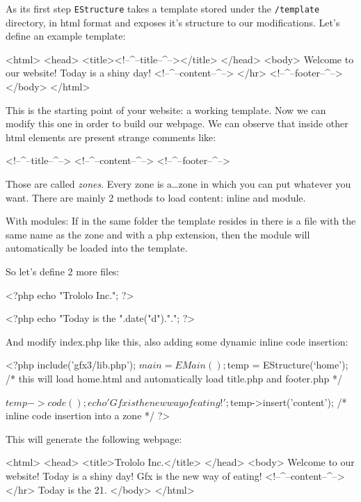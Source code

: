 \documentclass[a4paper,10pt]{article}
\newenvironment{file}[1]{
    \program
    \caption*{\textbf{File:} \texttt{#1}}
    \verbatim
}{
    \endverbatim
    \endprogram
}
\newenvironment{code}[1]{
    \program
    \caption*{#1}
    \verbatim
}{
    \endverbatim
    \endprogram
}
\begin{document}
As its first step \texttt{EStructure} takes a template stored under the \texttt{/template} directory,
in html format and exposes it's structure to our modifications. Let's define an example template:

\begin{file}{/template/home.html}
<html>
  <head>
    <title><!--^--title--^--></title>
  </head>
  <body>
    Welcome to our website! Today is a shiny day!
    <!--^--content--^-->
    </hr>
    <!--^--footer--^-->
  </body>
</html>
\end{file}

This is the starting point of your website: a working template. Now we can modify this one in order to build our webpage.
We can observe that inside other html elements are present strange comments like:
\begin{code}{Example zones}
<!--^--title--^-->
<!--^--content--^-->
<!--^--footer--^-->
\end{code}

Those are called \emph{zones}.
Every zone is a\ldots zone in which you can put whatever you want.
There are mainly 2 methods to load content: inline and module.

With modules:
If in the same folder the template resides in there is a file with the same name as the zone
and with a php extension, then the module will automatically be loaded into the template.

So let's define 2 more files:
\begin{file}{/template/title.php}
<?php
echo "Trololo Inc.";
?>
\end{file}

\begin{file}{/template/footer.php}
<?php
echo "Today is the ".date("d").".";
?>
\end{file}

And modify index.php like this, also adding some dynamic inline code insertion:

\begin{file}{/template/index.php}
<?php
include('gfx3/lib.php');
$main = EMain();
$temp = EStructure(`home');
/* this will load home.html and automatically
   load title.php and footer.php */

$temp->code();
echo 'Gfx is the new way of eating!';
$temp->insert('content');
/* inline code insertion into a zone */
?>
\end{file}

This will generate the following webpage:
\begin{code}{Result}
<html>
  <head>
    <title>Trololo Inc.</title>
  </head>
  <body>
    Welcome to our website! Today is a shiny day!
    Gfx is the new way of eating!
    <!--^--content--^-->
    </hr>
    Today is the 21.
  </body>
</html>
\end{code}
\end{document}
